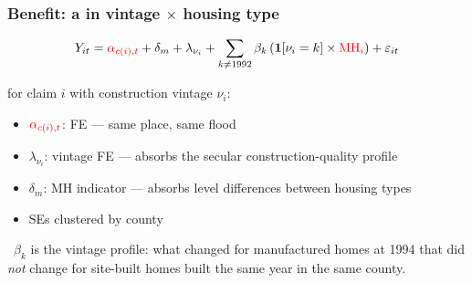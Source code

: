 \documentclass[11pt,xcolor={dvipsnames},hyperref={pdftex,pdfpagemode=UseNone,hidelinks,pdfdisplaydoctitle=true},usepdftitle=false,aspectratio=169]{beamer}
\begin{document}
\begin{frame}
    \frametitle{Benefit: a  in vintage $\times$ housing type}

    $$Y_{it} = \al{\alpha_{c(i),t}} + \delta_m + \lambda_{\nu_i} + \sum_{k \neq 1992} \beta_k \left(\mathbf{1}[\nu_i = k] \times \al{\text{MH}_i}\right) + \varepsilon_{it}$$

    \vspace{0.5em}

    for claim $i$ with construction vintage $\nu_i$:

    \begin{itemize}\setlength{\itemsep}{0.3em}
        \item $\al{\alpha_{c(i),t}}$:  FE --- same place, same flood
        \item $\lambda_{\nu_i}$: vintage FE  --- absorbs the secular construction-quality profile
        \item $\delta_m$: MH indicator --- absorbs level differences between housing types
        \item SEs clustered by county
    \end{itemize}

    \vspace{0.8em}
    \pause

    \so\ $\beta_k$ is the  vintage profile: what changed for manufactured homes at 1994 that did \emph{not} change for site-built homes built the same year in the same county.

\end{frame}
\end{document}
